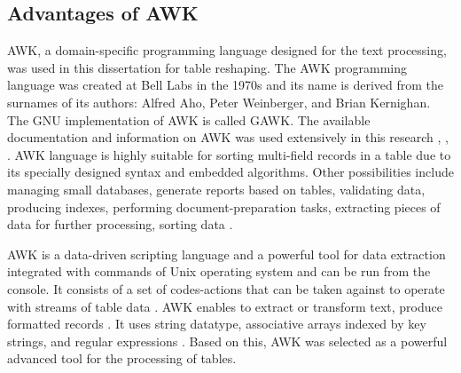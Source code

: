 \documentclass[11pt,a4paper]{report}
\begin{document}
{\subsection{Advantages of AWK}
AWK, a domain-specific programming language designed for the text processing, was used in this dissertation for table reshaping. The AWK programming language was created at Bell Labs in the 1970s \cite{Aho} and its name is derived from the surnames of its authors: Alfred Aho, Peter Weinberger, and Brian Kernighan. The GNU implementation of AWK is called GAWK. The available documentation and information on AWK was used extensively in this research \cite{Stutz}, \cite{Ahoetal1988}, \cite{Lieberman}. AWK language is highly suitable for sorting multi-field records in a table due to its specially designed syntax and embedded algorithms. Other possibilities include managing small databases, generate reports based on tables, validating data, producing indexes, performing document-preparation tasks, extracting pieces of data for further processing, sorting data \cite{Robbins2019}. 

AWK is a data-driven scripting language and a powerful tool for data extraction integrated with commands of Unix operating system and can be run from the console. It consists of a set of codes-actions that can be taken against to operate with streams of table data \cite{Robbins2000b}. AWK enables to extract or transform text, produce formatted records \cite{Robbins2001}. It uses string datatype, associative arrays indexed by key strings, and regular expressions \cite{Robbins2001b}. Based on this, AWK was selected as a powerful advanced tool for the processing of tables. 

}
\end{document}
